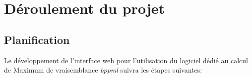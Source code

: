 
%

\section{Déroulement du projet} 

\subsection{Planification}

Le développement de l'interface web pour l'utilisation du 
logiciel dédié au calcul de Maximum de vraisemblance \textit{bppml} suivra les
 étapes suivantes:


